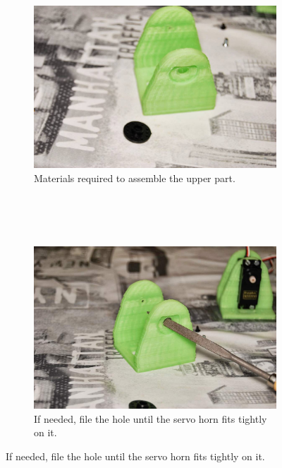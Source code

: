 \begin{figure}[H]
        \centering
        \begin{subfigure}[b]{0.46\textwidth}
                \centering
                \includegraphics[width=\textwidth]{images/REPY2_assembly_08.jpg}
                \caption{Materials required to assemble the upper part.\\~\\~}
                \label{fig:hardware_assembly_08}
        \end{subfigure}
        ~
        \begin{subfigure}[b]{0.46\textwidth}
                \centering
                \includegraphics[width=\textwidth]{images/REPY2_assembly_09.jpg}
                \caption{If needed, file the hole until the servo horn fits tightly on it.\\}
                \label{fig:hardware_assembly_09}

\end{subfigure}
\end{figure}
